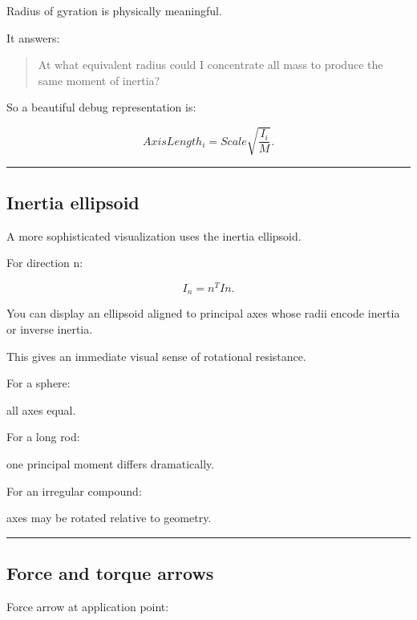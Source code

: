 Radius of gyration is physically meaningful.

It answers:

\begin{quote}
At what equivalent radius could I concentrate all mass to produce the same moment of inertia?
\end{quote}

So a beautiful debug representation is:

\[
AxisLength_i
=
Scale
\sqrt{\frac{I_i}{M}}.
\]

\begin{center}\rule{0.5\linewidth}{0.5pt}\end{center}

\subsection{Inertia ellipsoid}\label{06-engine-ii-ch039-inertia-ellipsoid}

\hypertarget{06-engine-ii-ch039-inertia-ellipsoid}{}

A more sophisticated visualization uses the inertia ellipsoid.

For direction n:

\[
I_n=n^TIn.
\]

You can display an ellipsoid aligned to principal axes whose radii encode inertia or inverse inertia.

This gives an immediate visual sense of rotational resistance.

For a sphere:

all axes equal.

For a long rod:

one principal moment differs dramatically.

For an irregular compound:

axes may be rotated relative to geometry.

\begin{center}\rule{0.5\linewidth}{0.5pt}\end{center}

\subsection{Force and torque arrows}\label{06-engine-ii-ch039-force-and-torque-arrows}

\hypertarget{06-engine-ii-ch039-force-and-torque-arrows}{}

Force arrow at application point:

